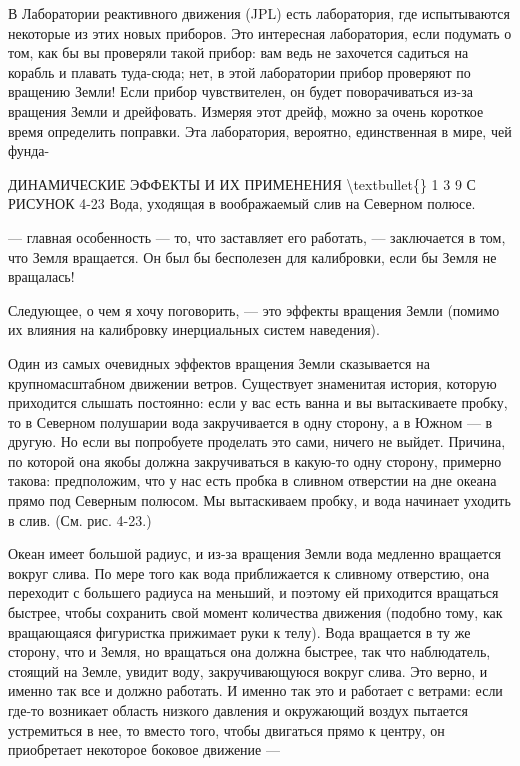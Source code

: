 \documentclass[10pt,oneside]{article}
\newcommand{\TipsSubsection}[1]{\par\vspace{6bp}{\normalsize\bfseries #1\par}\vspace{2bp}}
\begin{document}
В Лаборатории реактивного движения (JPL) есть лаборатория, где испытываются некоторые из этих новых приборов. Это интересная лаборатория, если подумать о том, как бы вы проверяли такой прибор: вам ведь не захочется садиться на корабль и плавать туда-сюда; нет, в этой лаборатории прибор проверяют по вращению Земли! Если прибор чувствителен, он будет поворачиваться из-за вращения Земли и дрейфовать. Измеряя этот дрейф, можно за очень короткое время определить поправки. Эта лаборатория, вероятно, единственная в мире, чей фунда-\par

ДИНАМИЧЕСКИЕ ЭФФЕКТЫ И ИХ ПРИМЕНЕНИЯ \textbackslash{}textbullet\{\} 1 3 9 С РИСУНОК 4-23 Вода, уходящая в воображаемый слив на Северном полюсе.\par

--- главная особенность --- то, что заставляет его работать, --- заключается в том, что Земля вращается. Он был бы бесполезен для калибровки, если бы Земля не вращалась!\par

\TipsSubsection{4-9 Влияние вращения Земли}

Следующее, о чем я хочу поговорить, --- это эффекты вращения Земли (помимо их влияния на калибровку инерциальных систем наведения).\par

Один из самых очевидных эффектов вращения Земли сказывается на крупномасштабном движении ветров. Существует знаменитая история, которую приходится слышать постоянно: если у вас есть ванна и вы вытаскиваете пробку, то в Северном полушарии вода закручивается в одну сторону, а в Южном --- в другую. Но если вы попробуете проделать это сами, ничего не выйдет. Причина, по которой она якобы должна закручиваться в какую-то одну сторону, примерно такова: предположим, что у нас есть пробка в сливном отверстии на дне океана прямо под Северным полюсом. Мы вытаскиваем пробку, и вода начинает уходить в слив. (См. рис. 4-23.)\par

Океан имеет большой радиус, и из-за вращения Земли вода медленно вращается вокруг слива. По мере того как вода приближается к сливному отверстию, она переходит с большего радиуса на меньший, и поэтому ей приходится вращаться быстрее, чтобы сохранить свой момент количества движения (подобно тому, как вращающаяся фигуристка прижимает руки к телу). Вода вращается в ту же сторону, что и Земля, но вращаться она должна быстрее, так что наблюдатель, стоящий на Земле, увидит воду, закручивающуюся вокруг слива. Это верно, и именно так все и должно работать. И именно так это и работает с ветрами: если где-то возникает область низкого давления и окружающий воздух пытается устремиться в нее, то вместо того, чтобы двигаться прямо к центру, он приобретает некоторое боковое движение ---\par
\end{document}
